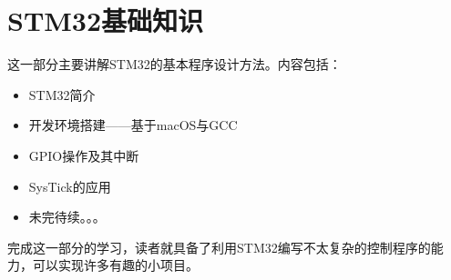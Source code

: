 \part{STM32基础知识}

这一部分主要讲解STM32的基本程序设计方法。内容包括：
\begin{itemize}
	\item STM32简介
	\item 开发环境搭建——基于macOS与GCC
	\item GPIO操作及其中断
	\item SysTick的应用
	\item 未完待续。。。
\end{itemize}

完成这一部分的学习，读者就具备了利用STM32编写不太复杂的控制程序的能力，可以实现许多有趣的小项目。

